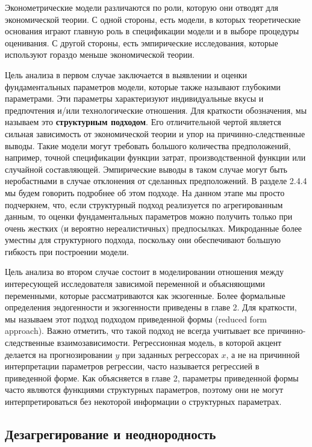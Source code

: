 	Эконометрические модели различаются по роли, которую они отводят для экономической теории. С одной стороны, есть модели, в которых теоретические основания играют  главную роль в спецификации модели и в выборе процедуры оценивания. С другой стороны, есть эмпирические исследования, которые используют гораздо меньше экономической теории.
	
	Цель анализа в первом случае заключается в выявлении и оценки фундаментальных параметров модели, которые также называют глубокими параметрами. Эти параметры  характеризуют индивидуальные вкусы и предпочтения и/или технологические отношения. Для краткости обозначения, мы называем это \textbf{структурным подходом}. Его отличительной чертой является сильная зависимость от экономической теории и упор на причинно-следственные выводы. 
	Такие модели могут требовать большого количества предположений, например, точной спецификации функции затрат, производственной функции или случайной составляющей. Эмпирические выводы в таком случае могут быть неробастными в случае отклонения от сделанных предположений. В разделе 2.4.4 мы будем говорить подробнее об этом подходе. На данном этапе мы просто подчеркнем, что, если структурный подход реализуется по агрегированным данным, то оценки фундаментальных параметров можно получить  только при очень жестких (и вероятно нереалистичных) предпосылках. Микроданные более уместны для структурного подхода, поскольку они обеспечивают большую гибкость при построении модели.
	
	
	Цель анализа во втором случае состоит в моделировании отношения между интересующей исследователя зависимой переменной и объясняющими переменными, которые рассматриваются как экзогенные. 
	Более формальные определения эндогенности и экзогенности приведены в главе 2. Для краткости, мы называем этот подход подходом приведенной формы (reduced form approach). 
	Важно отметить, что такой подход не всегда учитывает все причинно-следственные взаимозависимости. Регрессионная модель, в которой акцент делается на прогнозировании $y$ при заданных регрессорах $x$, а не на причинной интерпретации параметров регрессии, часто называется регрессией в приведенной форме. 
	Как объясняется в главе 2, параметры приведенной формы часто являются функциями структурных параметров, поэтому они не могут интерпретироваться без некоторой информации о структурных параметрах.



\subsection{Дезагрегирование и неоднородность}

